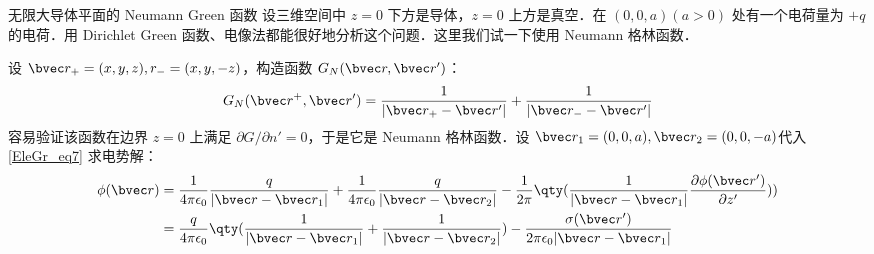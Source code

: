 \begin{example}{无限大导体平面的 Neumann Green 函数}
设三维空间中 $z=0$ 下方是导体，$z=0$ 上方是真空．在 $(0,0,a)(a>0)$ 处有一个电荷量为 $+q$ 的电荷．用 Dirichlet Green 函数、电像法都能很好地分析这个问题．这里我们试一下使用 Neumann 格林函数．

设 $\bvec r_+=(x,y,z),r_-=(x,y,-z)$，构造函数 $G_N(\bvec r,\bvec r')$：
\begin{equation}
G_N(\bvec r^+,\bvec r')=\frac{1}{|\bvec r_+-\bvec r'|}+\frac{1}{|\bvec r_--\bvec r'|}
\end{equation}
容易验证该函数在边界 $z=0$ 上满足 $\partial G/\partial n'=0$，于是它是 Neumann 格林函数．设 $\bvec r_1=(0,0,a),\bvec r_2=(0,0,-a)$代入\autoref{EleGr_eq7} 求电势解：
\begin{equation}
\begin{aligned}
\phi(\bvec r)&=\frac{1}{4\pi\epsilon_0}\frac{q}{|\bvec r-\bvec r_1|}+\frac{1}{4\pi\epsilon_0}\frac{q}{|\bvec r-\bvec r_2|}-\frac{1}{2\pi}\qty(\frac{1}{|\bvec r-\bvec r_1|}\frac{\partial \phi(\bvec r')}{\partial z'}))\\
&=\frac{q}{4\pi\epsilon_0}\qty(\frac{1}{|\bvec r-\bvec r_1|}+\frac{1}{|\bvec r-\bvec r_2|})-\frac{\sigma(\bvec r')}{2\pi\epsilon_0|\bvec r-\bvec r_1|}
\end{aligned}
\end{equation}

\end{example}
